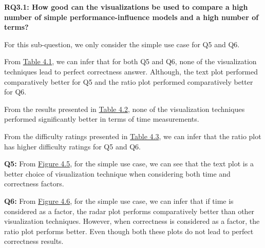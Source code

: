 \begin{mdframed} 
\textbf{RQ3.1: How good can the visualizations be used to compare a high number of simple performance-influence models and a high number of terms?}
\end{mdframed}

For this sub-question, we only consider the simple use case for Q5 and Q6.

\begin{description}[leftmargin=0pt]
\item[Correctness: ] From \hyperref[table:correctness]{Table 4.1}, we can infer that for both Q5 and Q6, none of the visualization techniques lead to perfect correctness answer. Although, the text plot performed comparatively better for Q5 and the ratio plot performed comparatively better for Q6.

\item[Time Measurements: ] From the results presented in \hyperref[table:time]{Table 4.2}, none of the visualization techniques performed significantly better in terms of time measurements.

\item[Difficulty Ratings: ] From the difficulty ratings presented in \hyperref[table:rating]{Table 4.3}, we can infer that the ratio plot has higher difficulty ratings for Q5 and Q6.

\end{description}

\textbf{Q5:} From \hyperref[figure:paretoManyQ5]{Figure 4.5}, for the simple use case, we can see that the text plot is a better choice of visualization technique when considering both time and correctness factors.

\textbf{Q6:} From \hyperref[figure:paretoManyQ6]{Figure 4.6}, for the simple use case, we can infer that if time is considered as a factor, the radar plot performs comparatively better than other visualization techniques. However, when correctness is considered as a factor, the ratio plot performs better. Even though both these plots do not lead to perfect correctness results.

